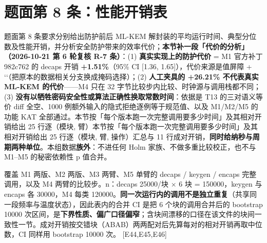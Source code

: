 \documentclass[UTF8,fontset=fandol,11pt,a4paper]{ctexart}
\begin{document}
\section{题面第 8 条：性能开销表}
题面第 8 条要求分别给出防护前后 ML-KEM 解封装的平均运行时间、典型分位数及性能开销，并分析安全防护带来的效率代价；\textbf{本节补一段「代价的分析」（2026-10-21 第 6 轮复核 R-7 条）}：(1) \textbf{真实实现上的防护代价} = M1 官方补丁 982c762 的 decaps 开销 \textbf{+1.51\%}（95\% CI [1.36, 1.65]），代价来源是值屏障 + `\texttt{}`（把原本的数据相关分支换成掩码选择）；(2) \textbf{人工夹具的 +26.21\% 不代表真实 ML-KEM 的代价}——M4 只在 32 字节比较步内比较、时钟源与调用栈都不同；(3) \textbf{没有以牺牲密码安全性或算法正确性换取常数时间}：依据是 T13 的三对语义等价 diff 全空、1000 例额外输入的隐式拒绝逐例等于规范值、以及 M1/M2/M5 的功能 KAT 全部通过。本节按「每个版本跑一次完整调用要多少时间」及其相对开销给出 25 行逐（模块, 臂）本节按「每个版本跑一次完整调用要多少时间」及其相对开销给出 25 行逐（模块, 臂, 操作）汇总与 11 行成对开销，\textbf{同时给纳秒与周期两种单位}。本组数据\textbf{族外}：不进任何 Holm 家族、不做多重比较校正，也不与 M1–M5 的秘密依赖性 p 值合并。


覆盖 M1 两版、M2 两版、M3 两臂、M5 单臂的 decaps / keygen / encaps 完整调用，以及 M4 两臂的比较步。n：decaps 25000/块 \texorpdfstring{$\times$}{x} 6 块 = 150000，keygen 与 encaps 各 30000，M4 每类 120000。\textbf{同一次运行内的调用不是独立重复}（共享同一段频率与温度状态），因此表内的合并 CI 是把 6 个块的调用合并后的 bootstrap 10000 次区间，是\textbf{下界性质、偏广口径偏窄}；含块间漂移的口径在该文件的块间一致性一节。成对开销按交错块（ABAB）两两配对后先算每对的相对开销再取中位数，CI 同样用 bootstrap 10000 次。 [E44,E45,E46]
\end{document}
